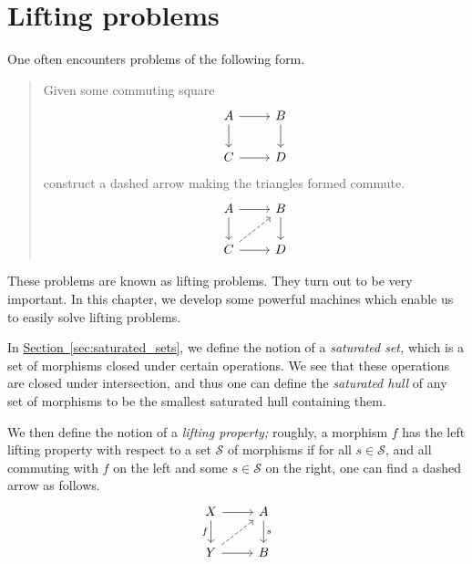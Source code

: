 \documentclass[main.tex]{subfiles}
\begin{document}
\chapter{Lifting problems}
\label{cha:lifting_problems}

One often encounters problems of the following form.
\begin{quote}
  Given some commuting square
  \begin{equation*}
    \begin{tikzcd}
      A
      \arrow[r]
      \arrow[d]
      & B
      \arrow[d]
      \\
      C
      \arrow[r]
      & D
    \end{tikzcd}
  \end{equation*}
  construct a dashed arrow making the triangles formed commute.
  \begin{equation*}
    \begin{tikzcd}
      A
      \arrow[r]
      \arrow[d]
      & B
      \arrow[d]
      \\
      C
      \arrow[ur, dashed]
      \arrow[r]
      & D
    \end{tikzcd}
  \end{equation*}
\end{quote}

These problems are known as lifting problems. They turn out to be very important. In this chapter, we develop some powerful machines which enable us to easily solve lifting problems.

In \hyperref[sec:saturated_sets]{Section~\ref*{sec:saturated_sets}}, we define the notion of a \emph{saturated set,} which is a set of morphisms closed under certain operations. We see that these operations are closed under intersection, and thus one can define the \emph{saturated hull} of any set of morphisms to be the smallest saturated hull containing them.

We then define the notion of a \emph{lifting property;} roughly, a morphism $f$ has the left lifting property with respect to a set $\mathcal{S}$ of morphisms if for all $s \in \mathcal{S}$, and all commuting with $f$ on the left and some $s \in \mathcal{S}$ on the right, one can find a dashed arrow as follows.
\begin{equation*}
  \begin{tikzcd}
    X
    \arrow[r]
    \arrow[d, swap, "f"]
    & A
    \arrow[d, "s"]
    \\
    Y
    \arrow[r]
    \arrow[ur, dashed]
    & B
  \end{tikzcd}
\end{equation*}
\end{document}

